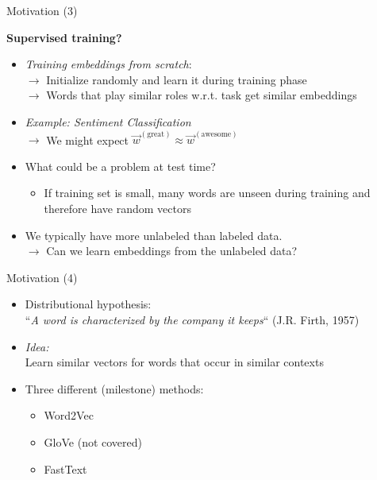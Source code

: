 \documentclass[11pt,compress,t,notes=noshow, xcolor=table]{beamer}
\begin{document}
\begin{vbframe}{Motivation (3)}

\vfill

\textbf{Supervised training?}

\begin{itemize}
	\item \textit{Training embeddings from scratch}:
	\\ $\rightarrow$ Initialize randomly and learn it during training phase
	\\ $\rightarrow$ Words that play similar roles w.r.t. task get similar embeddings
	\item \textit{Example: Sentiment Classification} 
	\\ $\rightarrow$ We might expect $\vec w^{(\text{great})} \approx \vec w^{(\text{awesome})}$
	\item \ques What could be a problem at test time?
	\begin{itemize}
		\item If training set is small, many words are unseen during training and therefore have random vectors
	\end{itemize}
	\item We typically have more unlabeled than labeled data.
	\\ $\rightarrow$ Can we learn embeddings from the unlabeled data?
\end{itemize}

\vfill

\end{vbframe}


\begin{vbframe}{Motivation (4)}

\vfill

\begin{itemize}
	\item Distributional hypothesis: 
	\\ {\centering ``\textit{A word is characterized by the company it keeps}``} (J.R. Firth, 1957)
	\item \textit{Idea:}\\ Learn similar vectors for words that occur in similar contexts
	\item Three different (milestone) methods:
		\begin{itemize}
			\item Word2Vec 
			\item GloVe (not covered) 
			\item FastText 
		\end{itemize}
\end{itemize}

\vfill

\end{vbframe}
\end{document}
